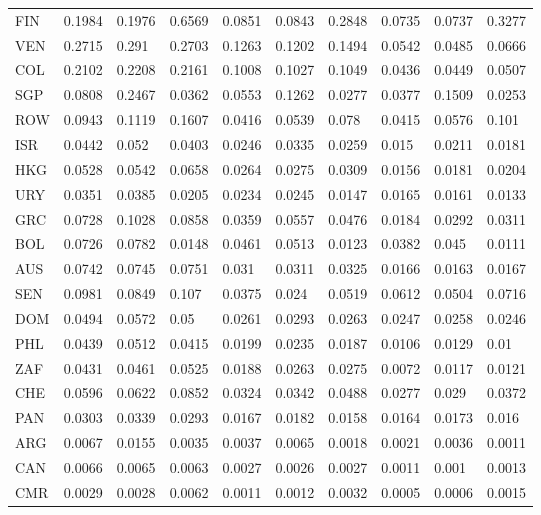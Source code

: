 \begin{table}[ht]
\begin{tabular}{llllllllll}
  FIN & 0.1984 & 0.1976 & 0.6569 & 0.0851 & 0.0843 & 0.2848 & 0.0735 & 0.0737 & 0.3277 \\ 
  VEN & 0.2715 & 0.291 & 0.2703 & 0.1263 & 0.1202 & 0.1494 & 0.0542 & 0.0485 & 0.0666 \\ 
  COL & 0.2102 & 0.2208 & 0.2161 & 0.1008 & 0.1027 & 0.1049 & 0.0436 & 0.0449 & 0.0507 \\ 
  SGP & 0.0808 & 0.2467 & 0.0362 & 0.0553 & 0.1262 & 0.0277 & 0.0377 & 0.1509 & 0.0253 \\ 
  ROW & 0.0943 & 0.1119 & 0.1607 & 0.0416 & 0.0539 & 0.078 & 0.0415 & 0.0576 & 0.101 \\ 
  ISR & 0.0442 & 0.052 & 0.0403 & 0.0246 & 0.0335 & 0.0259 & 0.015 & 0.0211 & 0.0181 \\ 
  HKG & 0.0528 & 0.0542 & 0.0658 & 0.0264 & 0.0275 & 0.0309 & 0.0156 & 0.0181 & 0.0204 \\ 
  URY & 0.0351 & 0.0385 & 0.0205 & 0.0234 & 0.0245 & 0.0147 & 0.0165 & 0.0161 & 0.0133 \\ 
  GRC & 0.0728 & 0.1028 & 0.0858 & 0.0359 & 0.0557 & 0.0476 & 0.0184 & 0.0292 & 0.0311 \\ 
  BOL & 0.0726 & 0.0782 & 0.0148 & 0.0461 & 0.0513 & 0.0123 & 0.0382 & 0.045 & 0.0111 \\ 
  AUS & 0.0742 & 0.0745 & 0.0751 & 0.031 & 0.0311 & 0.0325 & 0.0166 & 0.0163 & 0.0167 \\ 
  SEN & 0.0981 & 0.0849 & 0.107 & 0.0375 & 0.024 & 0.0519 & 0.0612 & 0.0504 & 0.0716 \\ 
  DOM & 0.0494 & 0.0572 & 0.05 & 0.0261 & 0.0293 & 0.0263 & 0.0247 & 0.0258 & 0.0246 \\ 
  PHL & 0.0439 & 0.0512 & 0.0415 & 0.0199 & 0.0235 & 0.0187 & 0.0106 & 0.0129 & 0.01 \\ 
  ZAF & 0.0431 & 0.0461 & 0.0525 & 0.0188 & 0.0263 & 0.0275 & 0.0072 & 0.0117 & 0.0121 \\ 
  CHE & 0.0596 & 0.0622 & 0.0852 & 0.0324 & 0.0342 & 0.0488 & 0.0277 & 0.029 & 0.0372 \\ 
  PAN & 0.0303 & 0.0339 & 0.0293 & 0.0167 & 0.0182 & 0.0158 & 0.0164 & 0.0173 & 0.016 \\ 
  ARG & 0.0067 & 0.0155 & 0.0035 & 0.0037 & 0.0065 & 0.0018 & 0.0021 & 0.0036 & 0.0011 \\ 
  CAN & 0.0066 & 0.0065 & 0.0063 & 0.0027 & 0.0026 & 0.0027 & 0.0011 & 0.001 & 0.0013 \\ 
  CMR & 0.0029 & 0.0028 & 0.0062 & 0.0011 & 0.0012 & 0.0032 & 0.0005 & 0.0006 & 0.0015 \\ 

\end{tabular}
\end{table}
